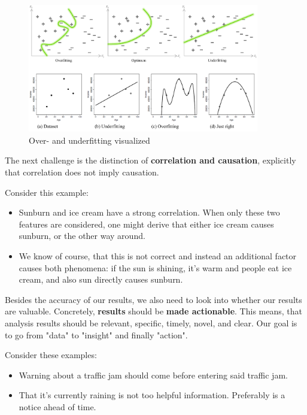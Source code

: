 \begin{figure}[H]
  \centering
  \includegraphics[width=0.9\textwidth]{assets/basics/over_under_fitting.png}
  \caption{Over- and underfitting visualized}
  \label{fig:1_over_under_fitting}
\end{figure}

The next challenge is the distinction of \textbf{correlation and causation}, explicitly that correlation does not imply causation. \begin{note}Consider this example:
\begin{itemize}
  \item Sunburn and ice cream have a strong correlation. When only these two features are considered, one might derive that either ice cream causes sunburn, or the other way around.
  \item We know of course, that this is not correct and instead an additional factor causes both phenomena: if the sun is shining, it's warm and people eat ice cream, and also sun directly causes sunburn.
\end{itemize}
\end{note}

Besides the accuracy of our results, we also need to look into whether our results are valuable. Concretely, \textbf{results} should be \textbf{made actionable}. This means, that analysis results should be relevant, specific, timely, novel, and clear. Our goal is to go from "data" to "insight" and finally "action". \begin{note}Consider these examples:
\begin{itemize}
  \item Warning about a traffic jam should come before entering said traffic jam.
  \item That it's currently raining is not too helpful information. Preferably is a notice ahead of time.
\end{itemize}
\end{note}

